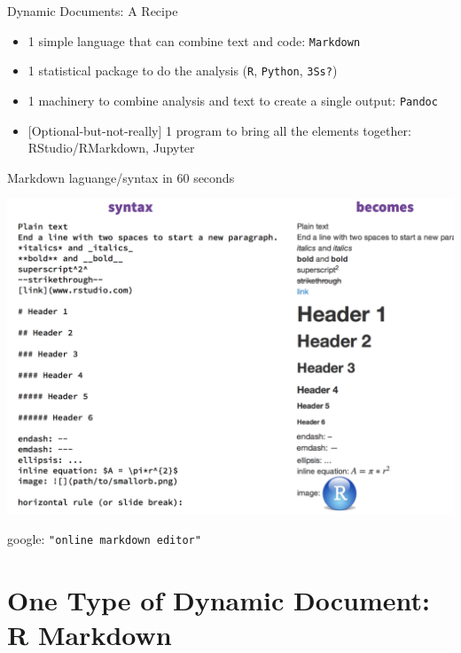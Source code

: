 \documentclass[ignorenonframetext,]{beamer}
\providecommand{\tightlist}{%
  \setlength{\itemsep}{0pt}\setlength{\parskip}{0pt}}
\begin{document}
\begin{frame}[fragile]{Dynamic Documents: A Recipe}
\protect\hypertarget{dynamic-documents-a-recipe}{}

\begin{itemize}
\tightlist
\item
  1 simple language that can combine text and code: \texttt{Markdown}
\item
  1 statistical package to do the analysis (\texttt{R}, \texttt{Python},
  \texttt{3S\textquotesingle{}s?})
\item
  1 machinery to combine analysis and text to create a single output:
  \texttt{Pandoc}
\item
  {[}Optional-but-not-really{]} 1 program to bring all the elements
  together: RStudio/RMarkdown, Jupyter
\end{itemize}

\end{frame}

\begin{frame}[fragile]{Markdown laguange/syntax in 60 seconds}
\protect\hypertarget{markdown-laguangesyntax-in-60-seconds}{}

\href{https://pandao.github.io/editor.md/en.html}{\includegraphics{../Images/RStudioCS.png}}

google: \texttt{"online\ markdown\ editor"}

\end{frame}

\hypertarget{one-type-of-dynamic-document-r-markdown}{%
\section{One Type of Dynamic Document: R
Markdown}\label{one-type-of-dynamic-document-r-markdown}}
\end{document}
